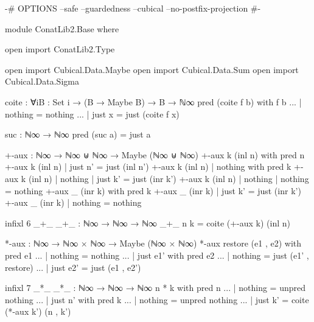 \begin{code}
{-# OPTIONS --safe --guardedness --cubical --no-postfix-projection #-}

module ConatLib2.Base where

open import ConatLib2.Type

open import Cubical.Data.Maybe
open import Cubical.Data.Sum
open import Cubical.Data.Sigma

coite : ∀{i}{B : Set i} → (B → Maybe B) → B → ℕ∞
pred (coite f b) with f b
... | nothing = nothing
... | just x  = just (coite f x)

suc : ℕ∞ → ℕ∞
pred (suc a) = just a

+-aux : ℕ∞ → ℕ∞ ⊎ ℕ∞ → Maybe (ℕ∞ ⊎ ℕ∞)
+-aux k (inl n) with pred n
+-aux k (inl n) | just n' = just (inl n')
+-aux k (inl n) | nothing with pred k
+-aux k (inl n) | nothing | just k' = just (inr k')
+-aux k (inl n) | nothing | nothing = nothing
+-aux _ (inr k) with pred k
+-aux _ (inr k) | just k' = just (inr k')
+-aux _ (inr k) | nothing = nothing

infixl 6 _+_
_+_ : ℕ∞ → ℕ∞ → ℕ∞
_+_ n k = coite (+-aux k) (inl n)

*-aux : ℕ∞ → ℕ∞ × ℕ∞ → Maybe (ℕ∞ × ℕ∞)
*-aux restore (e1 , e2) with pred e1
... | nothing = nothing
... | just e1' with pred e2
... | nothing = just (e1' , restore)
... | just e2' = just (e1 , e2')

infixl 7 _*_
_*_ : ℕ∞ → ℕ∞ → ℕ∞
n * k with pred n
... | nothing = unpred nothing
... | just n' with pred k
... | nothing = unpred nothing
... | just k' = coite (*-aux k') (n , k')
\end{code}
